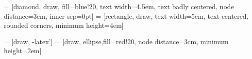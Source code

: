 









%


 = [diamond, draw, fill=blue!20, 
    text width=4.5em, text badly centered, node distance=3cm, inner sep=0pt]
 = [rectangle, draw, 
    text width=5em, text centered, rounded corners, minimum height=4em]

 = [draw, -latex']
 = [draw, ellipse,fill=red!20, node distance=3cm,
    minimum height=2em]
    
